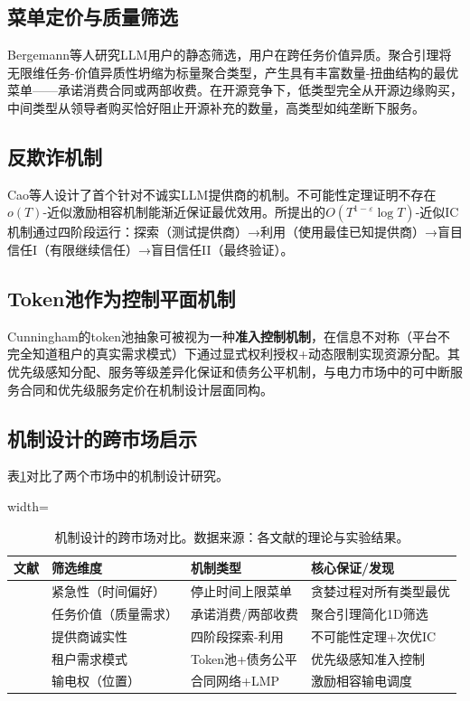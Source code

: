 \documentclass[11pt,twocolumn]{article}
\begin{document}
\subsection{菜单定价与质量筛选}

Bergemann等人\cite{bergemann2026menu}研究LLM用户的静态筛选，用户在跨任务价值异质。聚合引理将无限维任务-价值异质性坍缩为标量聚合类型，产生具有丰富数量-扭曲结构的最优菜单——承诺消费合同或两部收费。在开源竞争下，低类型完全从开源边缘购买，中间类型从领导者购买恰好阻止开源补充的数量，高类型如纯垄断下服务。

\subsection{反欺诈机制}

Cao等人\cite{cao2025pay}设计了首个针对不诚实LLM提供商的机制。不可能性定理证明不存在$o(T)$-近似激励相容机制能渐近保证最优效用。所提出的$O(T^{1-\varepsilon}\log T)$-近似IC机制通过四阶段运行：探索（测试提供商）→利用（使用最佳已知提供商）→盲目信任I（有限继续信任）→盲目信任II（最终验证）。

\subsection{Token池作为控制平面机制}

Cunningham\cite{cunningham2026token}的token池抽象可被视为一种\textbf{准入控制机制}，在信息不对称（平台不完全知道租户的真实需求模式）下通过显式权利授权+动态限制实现资源分配。其优先级感知分配、服务等级差异化保证和债务公平机制，与电力市场中的可中断服务合同和优先级服务定价\cite{stofft2002power}在机制设计层面同构。

\subsection{机制设计的跨市场启示}

表\ref{tab:mechanism}对比了两个市场中的机制设计研究。

\begin{table}[htbp]
\centering
\caption{机制设计的跨市场对比。数据来源：各文献的理论与实验结果。}
\label{tab:mechanism}
\scriptsize
\begin{adjustbox}{width=\columnwidth}
\begin{tabular}{p{1.5cm}p{2cm}p{2cm}p{2.5cm}}
\toprule
\textbf{文献} & \textbf{筛选维度} & \textbf{机制类型} & \textbf{核心保证/发现} \\
\midrule
\cite{zhong2026token} & 紧急性（时间偏好） & 停止时间上限菜单 & 贪婪过程对所有类型最优 \\
\cite{bergemann2026menu} & 任务价值（质量需求） & 承诺消费/两部收费 & 聚合引理简化1D筛选 \\
\cite{cao2025pay} & 提供商诚实性 & 四阶段探索-利用 & 不可能性定理+次优IC \\
\cite{cunningham2026token} & 租户需求模式 & Token池+债务公平 & 优先级感知准入控制 \\
\cite{hogan1992contract} & 输电权（位置） & 合同网络+LMP & 激励相容输电调度 \\
\bottomrule
\end{tabular}
\end{adjustbox}
\end{table}
\end{document}
